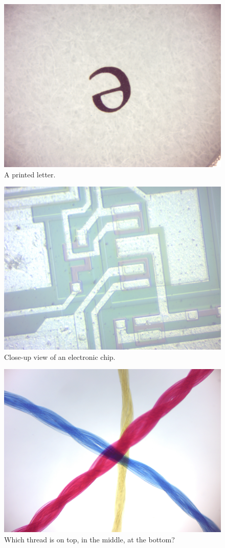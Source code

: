 \begin{figure}

{\centering \includegraphics[width=0.7\linewidth]{./figures/microscope/Letter_e}

}

\caption{A printed letter.}\label{fig:letter}
\end{figure}

\begin{figure}

{\centering \includegraphics[width=0.7\linewidth]{./figures/microscope/Chip}

}

\caption{Close-up view of an electronic chip.}\label{fig:chip}
\end{figure}

\begin{figure}

{\centering \includegraphics[width=0.7\linewidth]{./figures/microscope/Threads}

}

\caption{Which thread is on top, in the middle, at the bottom?}\label{fig:threads}
\end{figure}

